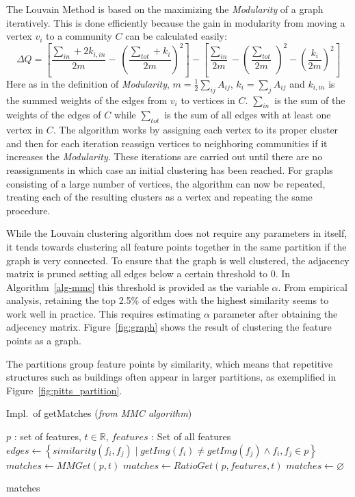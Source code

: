 The Louvain Method is based on the maximizing the \emph{Modularity} of a 
graph iteratively. This is done efficiently because the gain in 
modularity from moving a vertex $v_i$ to a community $C$ can be 
calculated easily:
\begin{equation*}
	\Delta Q = \left[ \frac{\sum_{in} + 2 k_{i,in}}{2m} - \
    \left(\frac{\sum_{tot} + k_i}{2m} \right)^2 \right]
	- \left[\frac{\sum_{in}}{2m} - \left(\frac{\sum_{tot}}{2m} \
	\right)^2 - \left( \frac{k_i}{2m} \right)^2 \right]
\end{equation*}
Here as in the definition of \emph{Modularity}, $m=\frac{1}{2} \sum_{ij} 
A_{ij}$, $k_i = \sum_j A_{ij}$ and $k_{i,in}$ is the summed weights of 
the edges from $v_i$ to vertices in $C$.  $\sum_{in}$ is the sum of the 
weights of the edges of $C$ while $\sum_{tot}$ is the sum of all edges 
with at least one vertex in $C$.  The algorithm works by assigning each 
vertex to its proper cluster and then for each iteration reassign 
vertices to neighboring communities if it increases the 
\emph{Modularity}.  These iterations are carried out until there are no 
reassignments in which case an initial clustering has been reached.  For 
graphs consisting of a large number of vertices, the algorithm can now 
be repeated, treating each of the resulting clusters as a vertex and 
repeating the same procedure.

While the Louvain clustering algorithm does not require any parameters 
in itself, it tends towards clustering all feature points together in 
the same partition if the graph is very connected.  To ensure that the 
graph is well clustered, the adjacency matrix is pruned setting all 
edges below a certain threshold to $0$. In Algorithm~\ref{alg-mmc} this 
threshold is provided as the variable $\alpha$.  From empirical 
analysis, retaining the top 2.5\% of edges with the highest similarity 
seems to work well in practice. This requires estimating $\alpha$ 
parameter after obtaining the adjecency matrix.  Figure~\ref{fig:graph} 
shows the result of clustering the feature points as a graph.

The partitions group feature points by similarity, which means that 
repetitive structures such as buildings often appear in larger 
partitions, as exemplified in Figure~\ref{fig:pitts_partition}.

\begin{algorithm}[htb]
\caption{Impl.\ of getMatches (\emph{from MMC algorithm})}
\label{alg-getmatches}
    \begin{algorithmic}
    \Require $p$ : set of features, $t\in \mathbb{R}$, $features$ : Set of 
    all features
    \State $edges \gets \left\{similarity(f_i, f_j) \mid getImg(f_i)
        \neq getImg(f_j) \wedge f_i, f_j \in p \right\}$
    \If{$\left\vert edges \right\vert > 1$}
        \State $matches \gets MMGet(p, t)$
        \State $matches \gets RatioGet(p, features, t)$
    \Else
        \State $matches \gets \varnothing$
    \EndIf

    \Return matches
    \end{algorithmic}
\end{algorithm}

